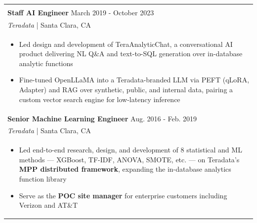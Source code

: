 \documentclass[letterpaper,11pt]{article} %
\begin{document}
\begin{tabular}{p{18.5cm}}
\begin{itemize}
\end{itemize} \\ 
\vspace{.1mm}

{\bf Staff AI Engineer} \hfill March 2019 - October 2023\\
{\it{Teradata}}  |  Santa Clara, CA\\


\begin{itemize}
\item Led design and development of TeraAnalyticChat, a conversational AI product delivering NL Q\&A and text-to-SQL generation over in-database analytic functions
\item Fine-tuned OpenLLaMA into a Teradata-branded LLM via PEFT (qLoRA, Adapter) and RAG over synthetic, public, and internal data, pairing a custom vector search engine for low-latency inference

\end{itemize} \\ 
\vspace{.1mm}

{\bf Senior Machine Learning Engineer} \hfill Aug. 2016 - Feb. 2019\\
{\it{Teradata}} | Santa Clara, CA\\

\begin{itemize}

\item Led end-to-end research, design, and development of 8 statistical and ML methods — XGBoost, TF-IDF, ANOVA, SMOTE, etc. — on Teradata's \textbf{MPP distributed framework}, expanding the in-database analytics function library
\item Serve as the \textbf{POC site manager} for enterprise customers including Verizon and AT\&T 


\end{itemize}
\end{tabular}
\end{document}
